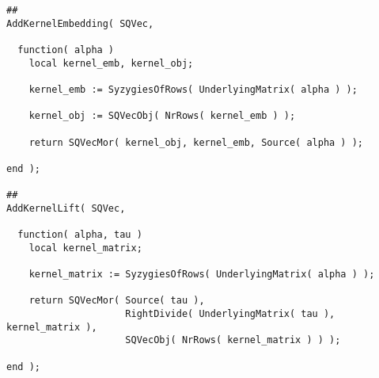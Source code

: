 \begin{small}
\begin{Verbatim}[frame=single]
##
AddKernelEmbedding( SQVec,

  function( alpha )
    local kernel_emb, kernel_obj;
    
    kernel_emb := SyzygiesOfRows( UnderlyingMatrix( alpha ) );
    
    kernel_obj := SQVecObj( NrRows( kernel_emb ) );
    
    return SQVecMor( kernel_obj, kernel_emb, Source( alpha ) );
    
end );

##
AddKernelLift( SQVec,

  function( alpha, tau )
    local kernel_matrix;
    
    kernel_matrix := SyzygiesOfRows( UnderlyingMatrix( alpha ) );

    return SQVecMor( Source( tau ),
                     RightDivide( UnderlyingMatrix( tau ), kernel_matrix ),
                     SQVecObj( NrRows( kernel_matrix ) ) );
    
end );
\end{Verbatim}
\end{small}